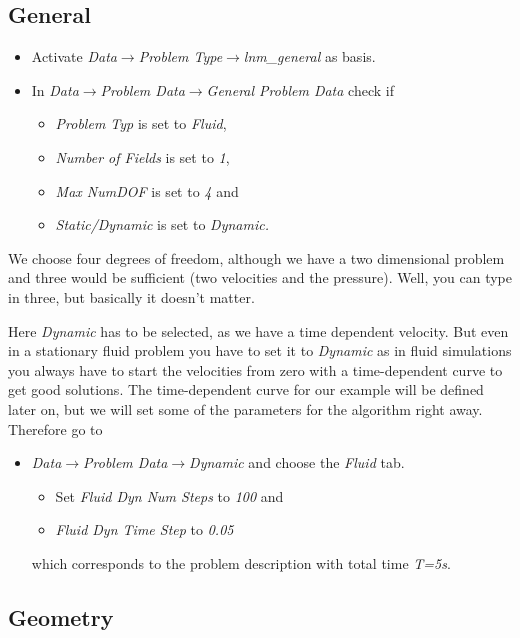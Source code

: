 \subsection{General}

\begin{itemize}
\item Activate \emph{Data$\to$Problem Type$\to$lnm\_general} as basis.
\item In \emph{Data$\to$Problem Data$\to$General Problem Data} check if

\begin{itemize}
\item \emph{Problem Typ} is set to \emph{Fluid},
\item \emph{Number of Fields} is set to \emph{1},
\item \emph{Max NumDOF} is set to \emph{4} and
\item \emph{Static/Dynamic} is set to \emph{Dynamic.}
\end{itemize}
\end{itemize}
We choose four degrees of freedom, although we have a two dimensional
problem and three would be sufficient (two velocities and the pressure).
Well, you can type in three, but basically it doesn't matter.

Here \emph{Dynamic} has to be selected, as we have a time dependent
velocity. But even in a stationary fluid problem you have to set it
to \emph{Dynamic} as in fluid simulations you always have to start
the velocities from zero with a time-dependent curve to get good
solutions. The time-dependent curve for our example will be defined later on,
but we will set some of the parameters for the algorithm right away. Therefore
go to
\begin{itemize}
\item \emph{Data$\to$Problem Data$\to$Dynamic} and choose the \emph{Fluid} tab.
\begin{itemize}
\item Set \emph{Fluid Dyn Num Steps} to \emph{100} and
\item \emph{Fluid Dyn Time Step} to \emph{0.05}
\end {itemize}
which corresponds to the problem description with total time \emph{T=5s}.
\end{itemize}


\subsection{Geometry}

